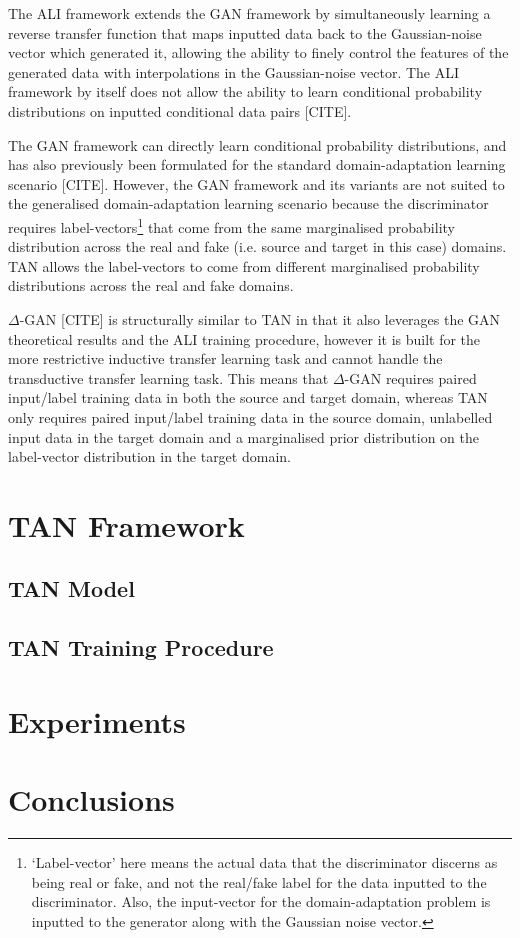 \documentclass{article}
\begin{document}
The ALI framework extends the GAN framework by simultaneously learning a reverse transfer function that maps inputted data back to the Gaussian-noise vector which generated it, allowing the ability to finely control the features of the generated data with interpolations in the Gaussian-noise vector. The ALI framework by itself does not allow the ability to learn conditional probability distributions on inputted conditional data pairs [CITE]. 

The GAN framework can directly learn conditional probability distributions, and has also previously been formulated for the standard domain-adaptation learning scenario [CITE]. However, the GAN framework and its variants are not suited to the generalised domain-adaptation learning scenario because the discriminator requires label-vectors\footnote{`Label-vector' here means the actual data that the discriminator discerns as being real or fake, and not the real/fake label for the data inputted to the discriminator. Also, the input-vector for the domain-adaptation problem is inputted to the generator along with the Gaussian noise vector.} that come from the same marginalised probability distribution across the real and fake (i.e. source and target in this case) domains. TAN allows the label-vectors to come from different marginalised probability distributions across the real and fake domains.

$\Delta$-GAN [CITE] is structurally similar to TAN in that it also leverages the GAN theoretical results and the ALI training procedure, however it is built for the more restrictive inductive transfer learning task and cannot handle the transductive transfer learning task. This means that $\Delta$-GAN requires paired input/label training data in both the source and target domain, whereas TAN only requires paired input/label training data in the source domain, unlabelled input data in the target domain and a marginalised prior distribution on the label-vector distribution in the target domain.

\section{TAN Framework}
\subsection{TAN Model}
\subsection{TAN Training Procedure}

\section{Experiments}

\section{Conclusions}

%

\end{document}

